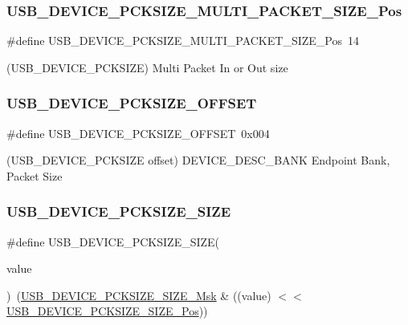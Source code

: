 \subsubsection{\texorpdfstring{USB\_DEVICE\_PCKSIZE\_MULTI\_PACKET\_SIZE\_Pos}{USB\_DEVICE\_PCKSIZE\_MULTI\_PACKET\_SIZE\_Pos}}
{\footnotesize\ttfamily \#define U\+S\+B\+\_\+\+D\+E\+V\+I\+C\+E\+\_\+\+P\+C\+K\+S\+I\+Z\+E\+\_\+\+M\+U\+L\+T\+I\+\_\+\+P\+A\+C\+K\+E\+T\+\_\+\+S\+I\+Z\+E\+\_\+\+Pos~14}



(U\+S\+B\+\_\+\+D\+E\+V\+I\+C\+E\+\_\+\+P\+C\+K\+S\+I\+ZE) Multi Packet In or Out size 

\mbox{\label{group___s_a_m_d21___u_s_b_ga187e4d2e49f2a3394c148f8ab1d49020}} 
\subsubsection{\texorpdfstring{USB\_DEVICE\_PCKSIZE\_OFFSET}{USB\_DEVICE\_PCKSIZE\_OFFSET}}
{\footnotesize\ttfamily \#define U\+S\+B\+\_\+\+D\+E\+V\+I\+C\+E\+\_\+\+P\+C\+K\+S\+I\+Z\+E\+\_\+\+O\+F\+F\+S\+ET~0x004}



(U\+S\+B\+\_\+\+D\+E\+V\+I\+C\+E\+\_\+\+P\+C\+K\+S\+I\+ZE offset) D\+E\+V\+I\+C\+E\+\_\+\+D\+E\+S\+C\+\_\+\+B\+A\+NK Endpoint Bank, Packet Size 

\mbox{\label{group___s_a_m_d21___u_s_b_ga20e48aa7acb99e33e791fd4fb5e8322a}} 
\subsubsection{\texorpdfstring{USB\_DEVICE\_PCKSIZE\_SIZE}{USB\_DEVICE\_PCKSIZE\_SIZE}}
{\footnotesize\ttfamily \#define U\+S\+B\+\_\+\+D\+E\+V\+I\+C\+E\+\_\+\+P\+C\+K\+S\+I\+Z\+E\+\_\+\+S\+I\+ZE(\begin{DoxyParamCaption}\item[{}]{value }\end{DoxyParamCaption})~(\mbox{\hyperlink{group___s_a_m_d21___u_s_b_gac8f37693735e2fd0c6ef9445ba2edd44}{U\+S\+B\+\_\+\+D\+E\+V\+I\+C\+E\+\_\+\+P\+C\+K\+S\+I\+Z\+E\+\_\+\+S\+I\+Z\+E\+\_\+\+Msk}} \& ((value) $<$$<$ \mbox{\hyperlink{group___s_a_m_d21___u_s_b_ga50418bff1c552e987f4925cb91cf32b9}{U\+S\+B\+\_\+\+D\+E\+V\+I\+C\+E\+\_\+\+P\+C\+K\+S\+I\+Z\+E\+\_\+\+S\+I\+Z\+E\+\_\+\+Pos}}))}

